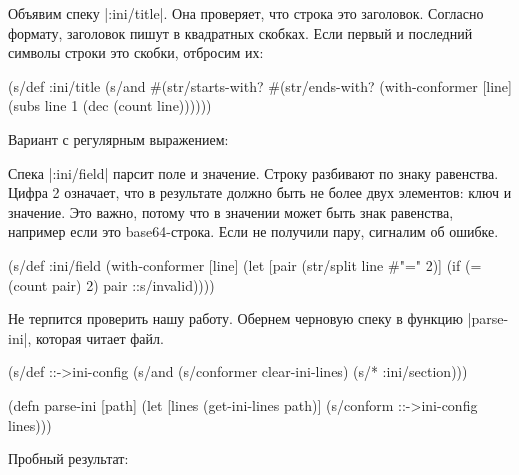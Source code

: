 Объявим спеку \spverb|:ini/title|. Она проверяет, что строка это
заголовок. Согласно формату, заголовок пишут в квадратных скобках. Если первый и
последний символы строки это скобки, отбросим их:

\begin{english}
  \begin{clojure}
(s/def :ini/title
  (s/and
   #(str/starts-with? %
   #(str/ends-with? %
   (with-conformer [line]
     (subs line 1 (dec (count line))))))
  \end{clojure}
\end{english}

\noindent
Вариант с регулярным выражением:

\begin{english}
\end{english}


Спека \spverb|:ini/field| парсит поле и значение. Строку разбивают по знаку
равенства. Цифра 2 означает, что в результате должно быть не более двух
элементов: ключ и значение. Это важно, потому что в значении может быть знак
равенства, например если это base64-строка. Если не получили пару, сигналим об
ошибке.

\begin{english}
  \begin{clojure}
(s/def :ini/field
  (with-conformer [line]
    (let [pair (str/split line #"=" 2)]
      (if (= (count pair) 2)
        pair
        ::s/invalid))))
  \end{clojure}
\end{english}

Не терпится проверить нашу работу. Обернем черновую спеку в функцию
\spverb|parse-ini|, которая читает файл.

\begin{english}
  \begin{clojure}
(s/def ::->ini-config
  (s/and
   (s/conformer clear-ini-lines)
   (s/* :ini/section)))

(defn parse-ini [path]
  (let [lines (get-ini-lines path)]
    (s/conform ::->ini-config lines)))
  \end{clojure}
\end{english}

\noindent
Пробный результат:

